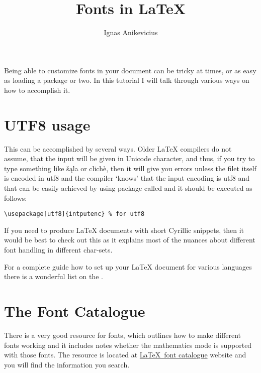 \documentclass[
]{scrartcl}
\title{Fonts in \LaTeX{}}
\author{Ignas Anikevicius}
\begin{document}
\maketitle
\tableofcontents
\listoftodos{\vskip 1em}

%
Being able to customize fonts in your  document can be tricky at
    times, or as easy as loading a package or two.
%
In this tutorial I will talk through various ways on how to accomplish it.

\section{UTF8 usage}

%
This can be accomplished by several ways.
%
Older \LaTeX{} compilers do not assume, that the input will be given in Unicode
    character, and thus, if you try to type something like šąla or clichè, then
    it will give you errors unless the filet itself is encoded in utf8 and the
    compiler `knows' that the input encoding is utf8 and that can be easily
    achieved by using package called  and it should be executed as
    follows:
%
\begin{lstlisting}
\usepackage[utf8]{intputenc} % for utf8
\end{lstlisting}

%
If you need to produce \LaTeX{} documents with short Cyrillic snippets, then it
    would be best to check out this
    as it explains most of the nuances about different font handling in
    different char-sets.

%
For a complete guide how to set up your \LaTeX{} document for various languages
    there is a wonderful list on the
    .

\section{The Font Catalogue}

%
There is a very good resource for fonts, which outlines how to make different
    fonts working and it includes notes whether the mathematics mode is
    supported with those fonts. 
%
The resource is located at \href{http://www.tug.dk/FontCatalogue/}{\LaTeX\ font
    catalogue} website and you will find the information you search.
\end{document}
